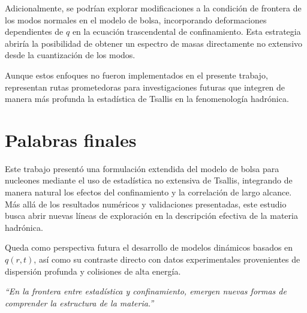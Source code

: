 Adicionalmente, se podrían explorar modificaciones a la condición de frontera de los modos normales en el modelo de bolsa, incorporando deformaciones dependientes de \( q \) en la ecuación trascendental de confinamiento. Esta estrategia abriría la posibilidad de obtener un espectro de masas directamente no extensivo desde la cuantización de los modos.

Aunque estos enfoques no fueron implementados en el presente trabajo, representan rutas prometedoras para investigaciones futuras que integren de manera más profunda la estadística de Tsallis en la fenomenología hadrónica.

\section*{Palabras finales}

Este trabajo presentó una formulación extendida del modelo de bolsa para nucleones mediante el uso de estadística no extensiva de Tsallis, integrando de manera natural los efectos del confinamiento y la correlación de largo alcance. Más allá de los resultados numéricos y validaciones presentadas, este estudio busca abrir nuevas líneas de exploración en la descripción efectiva de la materia hadrónica. 

Queda como perspectiva futura el desarrollo de modelos dinámicos basados en \( q(r,t) \), así como su contraste directo con datos experimentales provenientes de dispersión profunda y colisiones de alta energía.

\vspace{1em}
\noindent
\textit{“En la frontera entre estadística y confinamiento, emergen nuevas formas de comprender la estructura de la materia.”}





